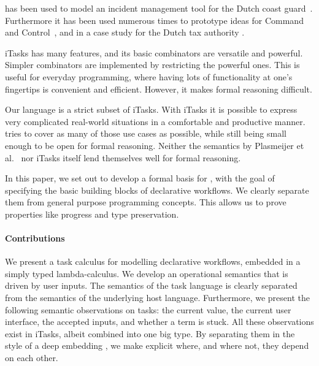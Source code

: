 \TOP has been used to model an incident management tool for the Dutch coast guard~\cite{conf/iscram/LijnseJP12}.
Furthermore it has been used numerous times to prototype ideas for Command and Control~\cite{theses/nlda/Kool17, theses/radboud/Stutterheim17}, and in a case study for the Dutch tax authority \cite{conf/sfp/StutterheimAP17}.

iTasks has many features, and its basic combinators are versatile and powerful.
Simpler combinators are implemented by restricting the powerful ones.
This is useful for everyday programming, where having lots of functionality at one's fingertips is convenient and efficient.
However, it makes formal reasoning difficult.

Our language is a strict subset of iTasks.
With iTasks it is possible to express very complicated real-world situations in a comfortable and productive manner.
\TOPHAT{}
tries to cover as many of those use cases as possible, while still being small enough to be open for formal reasoning.
Neither the semantics by Plasmeijer et al.~\cite{conf/ppdp/PlasmeijerLMAK12} nor iTasks itself lend themselves well for formal reasoning.




In this paper, we set out to develop a formal basis for \TOP, with the goal of specifying the basic building blocks of declarative workflows.
We clearly separate them from general purpose programming concepts.
This allows us to prove properties like progress and type preservation.



\paragraph{Contributions}

We present a task calculus for modelling declarative workflows, embedded in a simply typed lambda-calculus.
We develop an operational semantics that is driven by user inputs.
The semantics of the task language is clearly separated from the semantics of the underlying host language.
Furthermore, we present the following semantic observations on tasks: the current value, the current user interface, the accepted inputs, and whether a term is stuck.
All these observations exist in iTasks, albeit combined into one big type.
By separating them in the style of a deep embedding \cite{conf/cefp/Gibbons13}, we make explicit where, and where not, they depend on each other.

